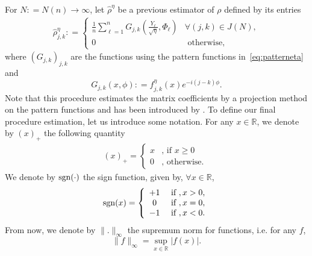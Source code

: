 \documentclass[a4paper]{amsart}
\newcommand{\deq}{\mathrel{\mathop:} = } %
\newcommand{\paren}[1]{{\left( #1 \right)}} %
\begin{document}
 For $N \deq N(n) \rightarrow \infty$, let $ \hat{\rho}^\eta$  be a previous
estimator of $\rho$ defined by  its entries
      \begin{eqnarray}
      \label{estrhojk}
       \hat{\rho}^\eta_{j,k} \deq \left\{
       \begin{array}{ccc}
       \frac{1}{n}
\sum_{\ell=1}^{n}G_{j,k}\paren{\frac{Y_\ell}{\sqrt\eta},\Phi_\ell} &
\forall(j,k)\in J (N),\\
                                                                                
                                               0      & \text{  otherwise, }
       \end{array}\right.
      \end{eqnarray}
%
where  $(G_{j,k})_{j,k}$ are the functions using the pattern functions
in~\eqref{eq:patterneta} and 
%
        \begin{equation}
        \label{Gjk}
         G_{j,k}(x,\phi) \deq f^\eta_{j,k}(x) e^{-i(j-k)\phi}.
         \end{equation}
Note that this procedure estimates the matrix coefficients by a projection
method on the pattern functions and has been introduced by  \cite{ABM}.
To define our final procedure estimation, let us introduce some notation. For
any $x\in\mathbb{R}$, we denote by
$(x)_{+}$ the following quantity
%
      \begin{eqnarray}
      \label{qte+}
     (x)_{+} = \left\{ \begin{array}{ccc}
                  x & \text{, if }x\geq 0\\
                  0 & \text{, otherwise. }
                   \end{array}\right.
     \end{eqnarray}
We denote by ${\rm sgn}(\cdot)$  the sign function, given by, $ \forall x\in\mathbb{R}$, 
      \begin{eqnarray}
      \label{sgn}
         {\rm sgn}(x) = \left\{ \begin{array}{ccc}
                       +1 & \text{  if },x>0,\\
                          0& \text{  if },x=0,\\
                          -1 &  \text{  if },x<0.
                             \end{array} \right.
         \end{eqnarray}
From now, we denote by $\|.\|_{\infty}$ the supremum norm for functions, i.e. for any $f$,
$$\|f\|_{\infty}=\sup_{x\in\mathbb{R}}|f(x)|.$$
\end{document}
